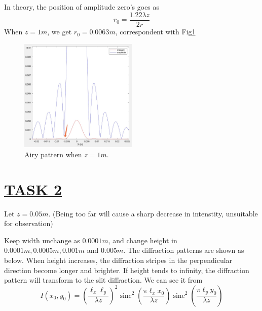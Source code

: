 \documentclass[fontsize=11pt]{scrartcl}
\begin{document}
\subsection{}
In theory, the position of amplitude zero's goes as
\begin{equation}
    r_0 = \frac{1.22 \lambda z}{2r}
\end{equation}
When $z = 1m$, we get $r_0 = 0.0063m$, correspondent with Fig\ref{fig1.4}
\begin{figure}[H]
    \centering
     \includegraphics[width=0.50\textwidth]{img/1_3.png}
     \caption{Airy pattern when $z = 1m$.}
     \label{fig1.4}
\end{figure}
\pagebreak
\section{\uline{TASK 2}}
Let $z = 0.05m$. (Being too far will cause a sharp decrease in intenstity, 
unsuitable for observation)

Keep width unchange as $0.0001m$, and change height in
$0.0001m, 0.0005m, 0.001m$ and $0.005m$. The diffraction patterns
are shown as below. When height increases, the diffraction stripes
in the perpendicular direction become longer and brighter. If height
tends to infinity, the diffraction pattern will transform to the 
slit diffraction. We can see it from
\begin{equation}
    I\left(x_{0}, y_{0}\right)=\left(\frac{\ell_{x} \ell_{y}}{\lambda z}\right)^{2} \operatorname{sinc}^{2}\left(\frac{\pi \ell_{x} x_{0}}{\lambda z}\right) \operatorname{sinc}^{2}\left(\frac{\pi \ell_{y} y_{0}}{\lambda z}\right)
\end{equation}
\end{document}
